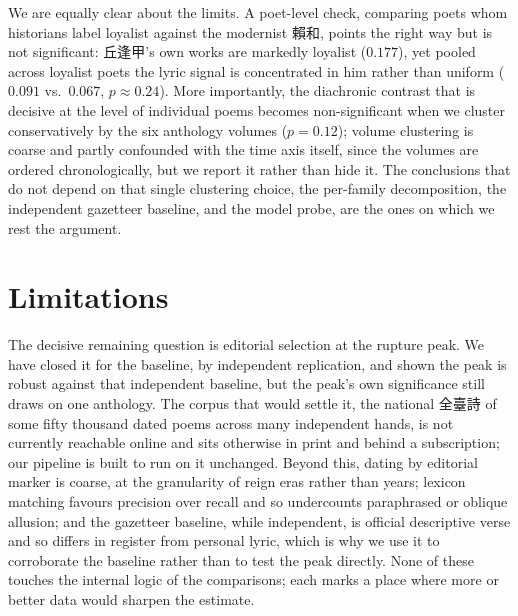 \documentclass[10pt,twocolumn]{article}
\begin{document}
We are equally clear about the limits. A poet-level check, comparing poets whom historians
label loyalist against the modernist \mbox{賴和}, points the right way but is not significant:
\mbox{丘逢甲}'s own works are markedly loyalist ($0.177$), yet pooled across loyalist poets the
lyric signal is concentrated in him rather than uniform ($0.091$ vs.\ $0.067$, $p\approx0.24$).
More importantly, the diachronic contrast that is decisive at the level of individual poems
becomes non-significant when we cluster conservatively by the six anthology volumes
($p=0.12$); volume clustering is coarse and partly confounded with the time axis itself, since
the volumes are ordered chronologically, but we report it rather than hide it. The conclusions
that do not depend on that single clustering choice, the per-family decomposition, the
independent gazetteer baseline, and the model probe, are the ones on which we rest the
argument.

\section{Limitations}
The decisive remaining question is editorial selection at the rupture peak. We have closed it
for the baseline, by independent replication, and shown the peak is robust against that
independent baseline, but the peak's own significance still draws on one anthology. The corpus
that would settle it, the national \mbox{全臺詩} of some fifty thousand dated poems across many
independent hands, is not currently reachable online and sits otherwise in print and behind a
subscription; our pipeline is built to run on it unchanged. Beyond this, dating by editorial
marker is coarse, at the granularity of reign eras rather than years; lexicon matching favours
precision over recall and so undercounts paraphrased or oblique allusion; and the gazetteer
baseline, while independent, is official descriptive verse and so differs in register from
personal lyric, which is why we use it to corroborate the baseline rather than to test the
peak directly. None of these touches the internal logic of the comparisons; each marks a place
where more or better data would sharpen the estimate.
\end{document}
